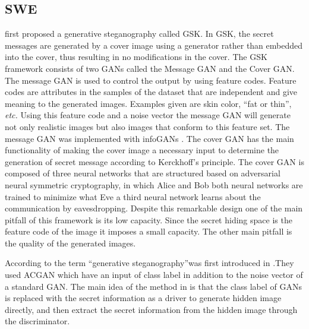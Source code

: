 \documentclass[../main/main.tex]{subfiles}
\begin{document}
	 \subsection{\gls{SWE}}
	  \cite{Ke} first proposed a generative steganography called \gls{GSK}. In \gls{GSK}, the secret messages are generated by a cover image using a generator rather than embedded into the cover, thus resulting in no modifications in the cover. The \gls{GSK} framework consists of two \gls{GAN}s called the Message \gls{GAN} and the Cover \gls{GAN}. The message \gls{GAN} is used to control the output by using feature codes. Feature codes are attributes in the samples of the dataset that are independent and give meaning to the generated images. Examples given are skin color, \textquotedblleft fat or thin\textquotedblright, \textit{etc.} Using this feature code and a noise vector the message \gls{GAN} will generate not only realistic images but also images that conform to this feature set. The message \gls{GAN} was implemented with \gls{infoGAN}s \cite{chen2016infogan}. The cover \gls{GAN} has the main functionality of making the cover image a necessary input to determine the generation of secret message according to Kerckhoff's principle.\cite{kerckhoff1883} The cover \gls{GAN} is composed of three neural networks that are structured based on adversarial neural symmetric cryptography\cite{abadi2016learning}, in which Alice and Bob both neural networks are trained to minimize what Eve a third neural network learns about the communication by eavesdropping. Despite this remarkable design one of the main pitfall of this framework is its low capacity. Since the secret hiding space is the feature code of the image it imposes a small capacity. The other main pitfall is the quality of the generated images.  
	  
	 According to \cite{Zhang2019} the term \textquotedblleft generative steganography\textquotedblright  was first introduced in \cite{Liu2018}.They used \gls{ACGAN} which have an input of class label in addition to the noise vector of a standard \gls{GAN}.  The main idea of the method in \cite{Liu2018} is that the class label of \gls{GAN}s is replaced with the secret information as a driver to generate hidden image directly, and then extract the secret information from the hidden image through the discriminator. %
	 
\end{document}
